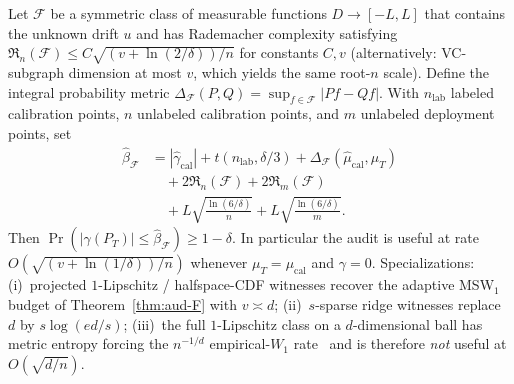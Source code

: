 \begin{theorem}\label{thm:aud-H}
Let $\mathcal F$ be a symmetric class of measurable functions $D\to[-L,L]$ that contains the
unknown drift $u$ and has Rademacher complexity satisfying
$\mathfrak R_n(\mathcal F)\le C\sqrt{(v+\ln(2/\delta))/n}$ for constants $C,v$
(alternatively: VC-subgraph dimension at most $v$, which yields the same root-$n$ scale).
Define the integral probability metric
$\Delta_{\mathcal F}(P,Q)=\sup_{f\in\mathcal F}|Pf-Qf|$. With $n_{\mathrm{lab}}$ labeled
calibration points, $n$ unlabeled calibration points, and $m$ unlabeled deployment points,
set
\begin{align*}
\widehat\beta_{\mathcal F}
&=|\widehat\gamma_{\mathrm{cal}}|+t(n_{\mathrm{lab}},\delta/3)
 +\Delta_{\mathcal F}(\widehat\mu_{\mathrm{cal}},\widehat\mu_T)\\
&\quad+2\mathfrak R_n(\mathcal F)+2\mathfrak R_m(\mathcal F)\\
&\quad+L\sqrt{\tfrac{\ln(6/\delta)}{n}}
 +L\sqrt{\tfrac{\ln(6/\delta)}{m}}.
\end{align*}
Then $\Pr(|\gamma(P_T)|\le\widehat\beta_{\mathcal F})\ge1-\delta$. In particular the audit is
useful at rate $O(\sqrt{(v+\ln(1/\delta))/n})$ whenever $\mu_T=\mu_{\mathrm{cal}}$ and
$\gamma=0$. Specializations:
\textup{(i)}~projected $1$-Lipschitz / halfspace-CDF witnesses recover the adaptive MSW$_1$
budget of Theorem~\ref{thm:aud-F} with $v\asymp d$;
\textup{(ii)}~$s$-sparse ridge witnesses replace $d$ by $s\log(ed/s)$;
\textup{(iii)}~the full $1$-Lipschitz class on a $d$-dimensional ball has metric entropy
forcing the $n^{-1/d}$ empirical-$W_1$ rate~\cite{fournier2015rate,weed2019sharp} and is
therefore \emph{not} useful at $O(\sqrt{d/n})$.
\end{theorem}
